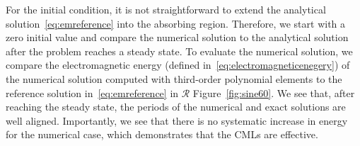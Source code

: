 \documentclass[a4paper]{article}
\begin{document}
For the initial condition, it is not straightforward to extend the
analytical solution~\eqref{eq:emreference} into the absorbing region.
Therefore, we start with a zero initial value and compare the
numerical solution to the analytical solution after the problem
reaches a steady state.  To evaluate the numerical solution, we
compare the electromagnetic energy (defined
in~\eqref{eq:electromagneticenegery}) of the numerical solution
computed with third-order polynomial elements to the reference
solution in~\eqref{eq:emreference} in $\mathcal{R}$
Figure~\ref{fig:sine60}.  We see that, after reaching the steady
state, the periods of the numerical and exact solutions are well
aligned. Importantly, we see that there is no systematic increase in
energy for the numerical case, which demonstrates that the CMLs are
effective.
\end{document}
